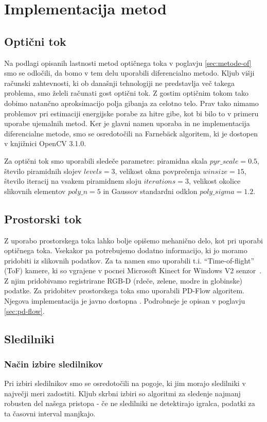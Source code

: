 \section{Implementacija metod}
\subsection{Optični tok}
Na podlagi opisanih lastnosti metod optičnega toka v poglavju \ref{sec:metode-of} smo se odločili, da bomo v tem delu uporabili diferencialno metodo. Kljub višji računski zahtevnosti, ki ob današnji tehnologiji ne predstavlja več takega problema, smo želeli računati gost optični tok. Z gostim optičnim tokom tako dobimo natančno aproksimacijo polja gibanja za celotno telo. Prav tako nimamo problemov pri estimaciji energijske porabe za hitre gibe, kot bi bilo to v primeru uporabe ujemalnih metod. Ker je glavni namen uporaba in ne implementacija diferencialne metode, smo se osredotočili na Farneb{\"a}ck algoritem, ki je dostopen v knjižnici OpenCV 3.1.0.

Za optični tok smo uporabili sledeče parametre: piramidna skala $pyr\_scale=0.5$, število piramidnih slojev $levels=3$, velikost okna povprečenja $winsize=15$, število iteracij na vsakem piramidnem sloju $iterations=3$, velikost okolice slikovnih elementov $poly\_n=5$ in Gaussov standardni odklon $poly\_sigma=1.2$.

\subsection{Prostorski tok}
Z uporabo prostorskega toka lahko bolje opišemo mehanično delo, kot pri uporabi optičnega toka. Vsekakor pa potrebujemo dodatno informacijo, ki jo moramo pridobiti iz slikovnih podatkov. Za ta namen smo uporabili t.i. ``Time-of-flight'' (ToF) kamere, ki so vgrajene v pocnei Microsoft Kinect for Windows V2 senzor~\cite{Yang2015KinectV2}. Z njim pridobivamo registrirane RGB-D (rdeče, zelene, modre in globinske) podatke. Za pridobitev prostorskega toka smo uporabili PD-Flow algoritem. Njegova implementacija je javno dostopna \cite{jaimez2015primal}. Podrobneje je opisan v poglavju \ref{sec:pd-flow}.



\subsection{Sledilniki}
\subsubsection{Način izbire sledilnikov}\label{sec:pogoji-sledilnikov}
Pri izbiri sledilnikov smo se osredotočili na pogoje, ki jim morajo sledilniki v največji meri zadostiti. Kljub skrbni izbiri so algoritmi za sledenje najmanj robusten del našega pristopa - če ne sledilniki ne detektirajo igralca, podatki za ta časovni interval manjkajo.

